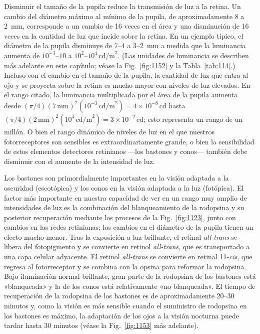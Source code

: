 \documentclass[12pt]{book}
\begin{document}
Disminuir el tamaño de la pupila reduce la transmisión de luz a la retina. Un cambio del diámetro máximo al mínimo de la pupila, de aproximadamente 8 a 2~mm, corresponde a un cambio de 16 veces en el área y una disminución de 16 veces en la cantidad de luz que incide sobre la retina. En un ejemplo típico, el diámetro de la pupila disminuye de 7--4 a 3--2~mm a medida que la luminancia aumenta de $10^{-3}$--$10$ a $10^2$--$10^4\,\text{cd/m}^2$. (Las unidades de luminancia se describen más adelante en este capítulo; véase la Fig.~\ref{fig:1152} y la Tabla~\ref{tab:114}.) Incluso con el cambio en el tamaño de la pupila, la cantidad de luz que entra al ojo y se proyecta sobre la retina es mucho mayor con niveles de luz elevados. En el rango citado, la luminancia multiplicada por el área de la pupila aumenta desde $(\pi/4)(7\,\text{mm})^2(10^{-3}\,\text{cd/m}^2) = 4\times10^{-8}\,\text{cd}$ hasta $(\pi/4)(2\,\text{mm})^2(10^4\,\text{cd/m}^2) = 3\times10^{-2}\,\text{cd}$; esto representa un rango de un millón. O bien el rango dinámico de niveles de luz en el que nuestros fotorreceptores son sensibles es extraordinariamente grande, o bien la sensibilidad de estos elementos detectores retinianos ---los bastones y conos--- también debe disminuir con el aumento de la intensidad de luz.

Los bastones son primordialmente importantes en la visión adaptada a la oscuridad (escotópica) y los conos en la visión adaptada a la luz (fotópica). El factor más importante en nuestra capacidad de ver en un rango muy amplio de intensidades de luz es la combinación del blanqueamiento de la rodopsina y su posterior recuperación mediante los procesos de la Fig.~\ref{fig:1123}, junto con cambios en las redes retinianas; los cambios en el diámetro de la pupila tienen un efecto mucho menor. Tras la exposición a luz brillante, el retinal \textit{all-trans} se libera del fotopigmento y se convierte en retinol \textit{all-trans}, que es transportado a una capa celular adyacente. El retinol \textit{all-trans} se convierte en retinal 11-\textit{cis}, que regresa al fotorreceptor y se combina con la opsina para reformar la rodopsina. Bajo iluminación normal brillante, gran parte de la rodopsina de los bastones está «blanqueada» y la de los conos está relativamente «no blanqueada». El tiempo de recuperación de la rodopsina de los bastones es de aproximadamente 20--30 minutos y, como la visión es más sensible cuando el suministro de rodopsina en los bastones es máximo, la adaptación de los ojos a la visión nocturna puede tardar hasta 30 minutos (véase la Fig.~\ref{fig:1153} más adelante).
\end{document}
